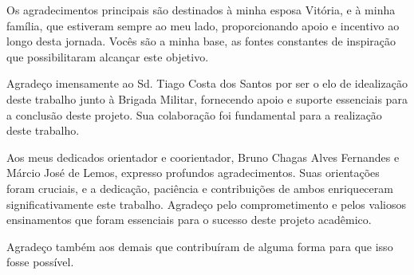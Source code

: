 \begin{agradecimentos}
    Os agradecimentos principais são destinados à minha esposa Vitória, e à minha família, que estiveram sempre ao meu lado, proporcionando apoio e incentivo ao longo desta jornada. Vocês são a minha base, as fontes constantes de inspiração que possibilitaram alcançar este objetivo.
    
    Agradeço imensamente ao Sd. Tiago Costa dos Santos por ser o elo de idealização deste trabalho junto à Brigada Militar, fornecendo apoio e suporte essenciais para a conclusão deste projeto. Sua colaboração foi fundamental para a realização deste trabalho.

    Aos meus dedicados orientador e coorientador, Bruno Chagas Alves Fernandes e Márcio José de Lemos, expresso profundos agradecimentos. Suas orientações foram cruciais, e a dedicação, paciência e contribuições de ambos enriqueceram significativamente este trabalho. Agradeço pelo comprometimento e pelos valiosos ensinamentos que foram essenciais para o sucesso deste projeto acadêmico.

    Agradeço também aos demais que contribuíram de alguma forma para que isso fosse possível.




\end{agradecimentos}